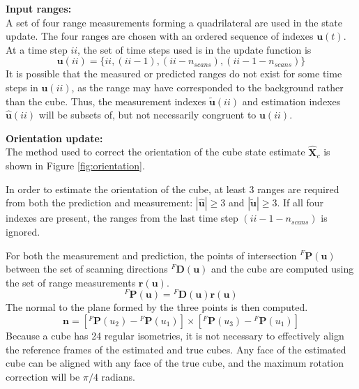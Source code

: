 		\textbf{Input ranges:}\\
			A set of four range measurements forming a quadrilateral are used in the state update. The four ranges are chosen with an ordered sequence of indexes $\textbf{u}(t)$. At a time step $ii$, the set of time steps used is in the update function is
			\begin{equation}
				\mathbf{u}(ii) = \{ii,(ii-1),(ii-n_{scans}),(ii-1-n_{scans})\}
			\end{equation}
			It is possible that the measured or predicted ranges do not exist for some time steps in $\mathbf{u}(ii)$, as the range may have corresponded to the background rather than the cube. 
			Thus, the measurement indexes $\tilde{\mathbf{u}}(ii)$ and estimation indexes $\hat{\mathbf{u}}(ii)$ will be subsets of, but not necessarily congruent to $\mathbf{u}(ii)$.
			
		\textbf{Orientation update:}\\
			The method used to correct the orientation of the cube state estimate $\hat{\mathbf{X}}_c$ is shown in Figure \ref{fig:orientation}. 
						
			In order to estimate the orientation of the cube, at least 3 ranges are required from both the prediction and measurement:
			$|\hat{\mathbf{u}}| \geq 3$ and $|\tilde{\mathbf{u}}| \geq 3$. If all four indexes are present, the ranges from the last time step $(ii-1-n_{scans})$ is ignored.
	
			For both the measurement and prediction, the points of intersection $^{F}\mathbf{P}(\mathbf{u})$ between the set of scanning directions ${^{F}\mathbf{D}(\mathbf{u})}$ and the cube are computed using the set of range measurements $\mathbf{r}(\mathbf{u})$.
			\begin{equation} \label{eq:points}
				^{F}\mathbf{P}(\mathbf{u}) = {^{F}\mathbf{D}(\mathbf{u})}\mathbf{r}(\mathbf{u})
			\end{equation}
			The normal to the plane formed by the three points is then computed.
			\begin{equation}
				\mathbf{n} = [{^{F}\mathbf{P}}(u_2) - {^{F}\mathbf{P}}(u_1)] \times [{^{F}\mathbf{P}}(u_3) - {^{F}\mathbf{P}}(u_1)]
			\end{equation}
			Because a cube has 24 regular isometries, it is not necessary to effectively align the reference frames of the estimated and true cubes. Any face of the estimated cube can be aligned with any face of the true cube, and the maximum rotation correction will be $\pi/4$ radians.

